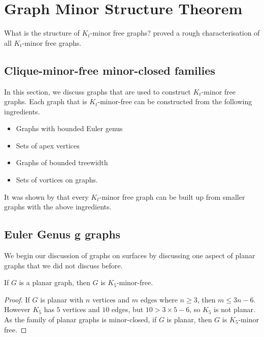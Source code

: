 \section{Graph Minor Structure Theorem}\label{sec:Kt_Minor_Free}
What is the structure of \(K_t\)-minor free graphs? \textcite{robertsonGraphMinorsXVII1999} proved a rough characterisation of all \(K_t\)-minor free graphs. 
\subsection{Clique-minor-free minor-closed families}\label{ssec:Kt_Minor_Closed_families}
In this section, we discuss graphs that are used to construct \(K_t\)-minor free graphs. Each graph that is $K_t$-minor-free can be constructed from the following ingredients.
\begin{itemize}
	\item Graphs with bounded Euler genus
	\item Sets of apex vertices
	\item Graphs of bounded treewidth
	\item Sets of vortices on graphs.
\end{itemize}
It was shown by \textcite{robertsonGraphMinorsXVII1999} that every \(K_t\)-minor free graph can be built up from smaller graphs with the above ingredients.
\subsection{Euler Genus g graphs}
We begin our discussion of graphs on surfaces by discussing one aspect of planar graphs that we did not discuss before. 
\begin{theorem}\label{thm:K5_Free_Planar}
	If \(G\) is a planar graph, then \(G\) is \(K_5\)-minor-free.
\end{theorem}
\begin{proof}
	If \(G\) is planar with \(n\) vertices and \(m\) edges where $n \geq 3$, then \(m \leq 3n -6\).
	 However \(K_5\) has \(5\) vertices and \(10\) edges, but  \( 10 > 3 \times 5 - 6\), so \(K_5\) is not planar. As the family of planar graphs is minor-closed, if \(G\) is planar, then $G$ is \(K_5\)-minor free.
\end{proof}

